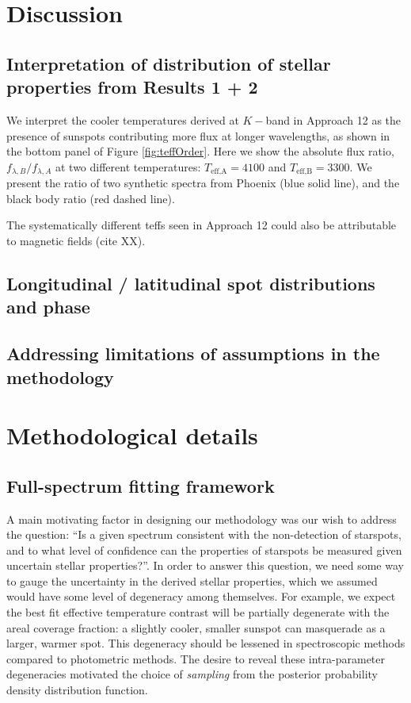 \documentclass[onecolumn]{emulateapj}%
\begin{document}
\section{Discussion}

\subsection{Interpretation of distribution of stellar properties from Results 1 + 2}

We interpret the cooler temperatures derived at $K-$band in Approach 12 as the presence of sunspots contributing more flux at longer wavelengths, as shown in the bottom panel of Figure \ref{fig:teffOrder}.  Here we show the absolute flux ratio, $f_{\lambda, B} / f_{\lambda, A}$ at two different temperatures: $T_\textrm{eff,A} = 4100$ and $T_\textrm{eff,B} = 3300$.  We present the ratio of two synthetic spectra from Phoenix (blue solid line), and the black body ratio (red dashed line).  

The systematically different teffs seen in Approach 12 could also be attributable to magnetic fields (cite XX).

\subsection{Longitudinal / latitudinal spot distributions and phase}

\subsection{Addressing limitations of assumptions in the methodology}



\appendix

\section{Methodological details}
\label{methods-details}

\subsection{Full-spectrum fitting framework}


A main motivating factor in designing our methodology was our wish to address the question: ``Is a given spectrum consistent with the non-detection of starspots, and to what level of confidence can the properties of starspots be measured given uncertain stellar properties?''.  In order to answer this question, we need some way to gauge the uncertainty in the derived stellar properties, which we assumed would have some level of degeneracy among themselves.  For example, we expect the best fit effective temperature contrast will be partially degenerate with the areal coverage fraction: a slightly cooler, smaller sunspot can masquerade as a larger, warmer spot.  This degeneracy should be lessened in spectroscopic methods compared to photometric methods.  The desire to reveal these intra-parameter degeneracies motivated the choice of \emph{sampling} from the posterior probability density distribution function.
\end{document}
